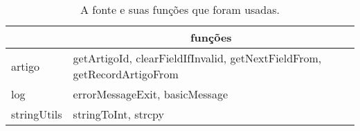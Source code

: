 \begin{table}[!htbp]
  \centering
    \begin{tabular}{l|l}
    \rowcolor[rgb]{ .647,  .647,  .647} \multicolumn{1}{c|}{\textcolor[rgb]{ 1,  1,  1}{\textbf{fonte .hpp}}} & \multicolumn{1}{c}{\textcolor[rgb]{ 1,  1,  1}{\textbf{funções}}} \\
    \midrule
    \rowcolor[rgb]{ .859,  .859,  .859} artigo & getArtigoId, clearFieldIfInvalid, getNextFieldFrom, getRecordArtigoFrom \\
    \midrule
    \rowcolor[rgb]{ .929,  .929,  .929} log   & errorMessageExit, basicMessage \\
    \midrule
    \rowcolor[rgb]{ .859,  .859,  .859} stringUtils & stringToInt, strcpy \\
    \end{tabular}%
  \caption{A fonte e suas funções que foram usadas.}
  \label{tab:codigos_funcoes}%
\end{table}%
